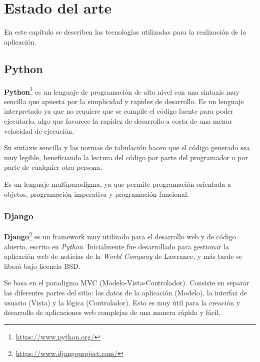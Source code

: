 \documentclass[a4paper, 12pt]{book}
\begin{document}

\cleardoublepage
\chapter{Estado del arte}

En este capítulo se describen las tecnologías utilizadas para la realización de la aplicación.


\section{Python} 
\label{sec:python}

\textbf{Python}\footnote{\url{https://www.python.org/}} es un lenguaje de programación de alto nivel con una sintaxis muy sencilla que apuesta por la simplicidad y rapidez de desarrollo. Es un lenguaje interpretado ya que no requiere que se compile el código fuente para poder ejecutarlo, algo que favorece la rapidez de desarrollo a costa de una menor velocidad de ejecución.
\newline

Su sintaxis sencilla y las normas de tabulación hacen que el código generado sea muy legible, beneficiando la lectura del código por parte del programador o por parte de cualquier otra persona.
\newline

Es un lenguaje multiparadigma, ya que permite programación orientada a objetos, programación imperativa y programación funcional.


\subsection{Django} 
\label{subsec:django}

\textbf{Django}\footnote{\url{https://www.djangoproject.com/}} es un framework muy utilizado para el desarrollo web y de código abierto, escrito en \textit{Python}. Inicialmente fue desarrollado para gestionar la aplicación web de noticias de la \textit{World Company} de Lawrance, y más tarde se liberó bajo licencia BSD.
\newline

Se basa en el paradigma MVC (Modelo-Vista-Controlador). Consiste en separar las diferentes partes del sitio: los datos de la aplicación (Modelo), la interfaz de usuario (Vista) y la lógica (Controlador). Esto es muy útil para la creación y desarrollo de aplicaciones web complejas de una manera rápida y fácil.
\newline
\end{document}

